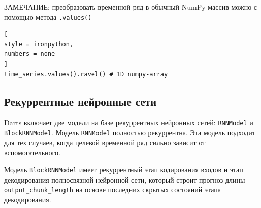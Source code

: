 \documentclass[%
	11pt,
	a4paper,
	utf8,
		]{article}
\begin{document}
ЗАМЕЧАНИЕ: преобразовать временной ряд в обычный NumPy-массив можно с помощью метода \texttt{.values()}
\begin{lstlisting}[
style = ironpython,
numbers = none	
]
time_series.values().ravel() # 1D numpy-array
\end{lstlisting}

\subsection{Рекуррентные нейронные сети}

Darts включает две модели на базе рекуррентных нейронных сетей: \texttt{RNNModel} и \texttt{BlockRNNModel}. Модель \texttt{RNNModel} полностью рекуррентна. Эта модель подходит для тех случаев, когда целевой временной ряд сильно зависит от вспомогательного.

Модель \texttt{BlockRNNModel} имеет рекуррентный этап кодирования входов и этап декодирования полносвязной нейронной сети, который строит прогноз длины \texttt{output\_chunk\_length} на основе последних скрытых состояний этапа декодирования.
\end{document}
